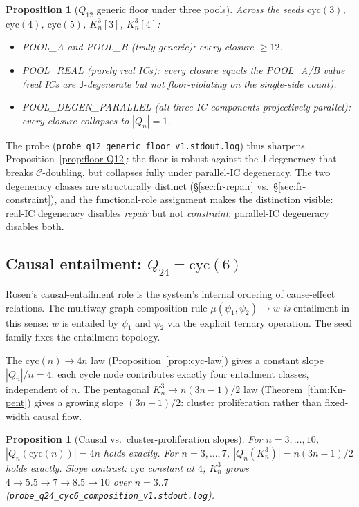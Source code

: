 \documentclass[12pt,a4paper]{article}
\newtheorem{proposition}[theorem]{Proposition}
\theoremstyle{definition}
\theoremstyle{remark}
\newcommand{\Kn}{K_n^3}
\newcommand{\Qn}{Q_n}
\newcommand{\Ccls}{\mathcal{C}}             %
\newcommand{\Jconj}{\mathsf{J}}             %
\newcommand{\cyc}{\mathrm{cyc}}
\begin{document}
\begin{proposition}[$Q_{12}$ generic floor under three pools]\label{prop:Q12-three-pools}
Across the seeds $\cyc(3)$, $\cyc(4)$, $\cyc(5)$, $\Kn[3]$, $\Kn[4]$:
\begin{itemize}\setlength\itemsep{0pt}
\item POOL\_A and POOL\_B (truly-generic): every closure $\ge 12$.
\item POOL\_REAL (purely real ICs): every closure equals the
POOL\_A/B value (real ICs are $\Jconj$-degenerate but not floor-violating
on the single-side count).
\item POOL\_DEGEN\_PARALLEL (all three IC components projectively parallel):
every closure collapses to $|\Qn| = 1$.
\end{itemize}
\end{proposition}

The probe (\texttt{probe\_q12\_generic\_floor\_v1.stdout.log}) thus
sharpens Proposition~\ref{prop:floor-Q12}: the floor is robust against
the $\Jconj$-degeneracy that breaks $\Ccls$-doubling, but collapses
fully under parallel-IC degeneracy. The two degeneracy classes are
structurally distinct (\S\ref{sec:fr-repair} vs.\
\S\ref{sec:fr-constraint}), and the functional-role assignment makes
the distinction visible: real-IC degeneracy disables \emph{repair} but
not \emph{constraint}; parallel-IC degeneracy disables both.

\subsection{Causal entailment: $Q_{24} = \cyc(6)$}\label{sec:fr-causal}

Rosen's causal-entailment role is the system's internal ordering of
cause-effect relations. The multiway-graph composition rule
$\mu(\psi_1, \psi_2) \to w$ \emph{is} entailment in this sense: $w$
is entailed by $\psi_1$ and $\psi_2$ via the explicit ternary
operation. The seed family fixes the entailment topology.

The $\cyc(n) \to 4n$ law (Proposition~\ref{prop:cyc-law}) gives a
constant slope $|\Qn|/n = 4$: each cycle node contributes exactly four
entailment classes, independent of $n$. The pentagonal $\Kn \to
n(3n{-}1)/2$ law (Theorem~\ref{thm:Kn-pent}) gives a growing slope
$(3n{-}1)/2$: cluster proliferation rather than fixed-width causal
flow.

\begin{proposition}[Causal vs.\ cluster-proliferation slopes]\label{prop:causal-slope}
For $n = 3, \ldots, 10$, $|\Qn(\cyc(n))| = 4n$ holds exactly.
For $n = 3, \ldots, 7$, $|\Qn(\Kn)| = n(3n{-}1)/2$ holds exactly.
Slope contrast: $\cyc$ constant at $4$; $\Kn$ grows $4 \to 5.5 \to 7
\to 8.5 \to 10$ over $n=3..7$
(\texttt{probe\_q24\_cyc6\_composition\_v1.stdout.log}).
\end{proposition}
\end{document}
